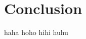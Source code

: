
\chapter{Conclusion}

haha \cite{Doerrer87:ELS} hoho \cite[dfdf]{Rodler01:EEF} hihi \cite{Hallinan99:DOM} huhu \cite{Bamford96:AWI}